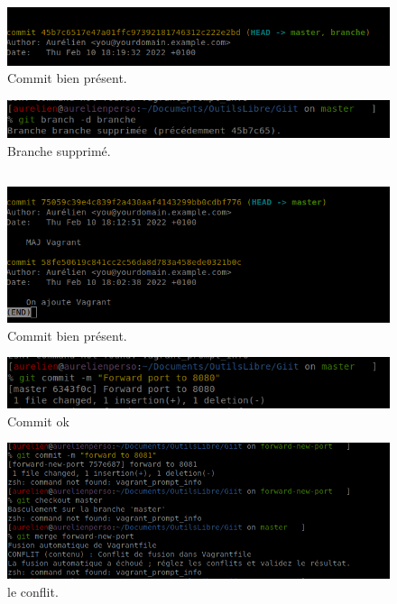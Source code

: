 \documentclass{article}
\begin{document}
\begin{figure}[h]
\centering
\includegraphics[width=0.7\columnwidth]{screen/git2_4.png}
\caption{\label{fig:frog}Commit bien présent.}
\end{figure}

\begin{figure}[h]
\includegraphics[width=0.7\columnwidth]{screen/git2_5.png}
\caption{\label{fig:frog}Branche supprimé.}
\end{figure}

\subsection{}

\begin{figure}[h]
\centering
\includegraphics[width=0.7\columnwidth]{screen/git3.png}
\caption{\label{fig:frog}Commit bien présent.}
\end{figure}

\begin{figure}[h]
\centering
\includegraphics[width=0.7\columnwidth]{screen/git3_1.png}
\caption{\label{fig:frog}Commit ok}
\end{figure}

\begin{figure}[h]
\centering
\includegraphics[width=0.7\columnwidth]{screen/git3_2.png}
\caption{\label{fig:frog}le conflit.}
\end{figure}
\end{document}
